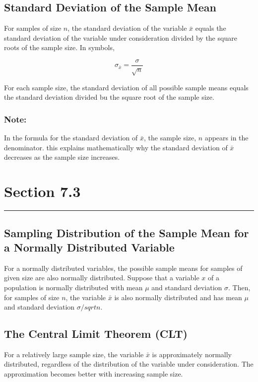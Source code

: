 \documentclass[12pt]{article}
\begin{document}
        \subsection*{Standard Deviation of the Sample Mean}
            For samples of size $n$, the standard deviation of the variable $\bar{x}$ equals the 
            standard deviation of the variable under consideration divided by the square roots
            of the sample size. In symbols,
            \begin{center}
                \[
                    \sigma_{\bar{x}} = \frac{\sigma}{\sqrt{n}}
                \]
            \end{center}
            For each sample size, the standard deviation of all possible sample means equals the
            standard deviation divided bu the square root of the sample size.
            \subsubsection*{Note:}
                In the formula for the standard deviation of $\bar{x}$, the sample size, $n$
                appears in the denominator. this explains mathematically why the standard
                deviation of $\bar{x}$ decreases as the sample size increases.
    \section*{Section 7.3}
    \noindent\rule{\textwidth}{0.4pt}
        \subsection*{Sampling Distribution of the Sample Mean for a Normally Distributed
        Variable}
            For a normally distributed variables, the possible sample means for samples of given
            size are also normally distributed. Suppose that a variable $x$ of a population is
            normally distributed with mean $\mu$ and standard deviation $\sigma$. Then, for
            samples of size $n$, the variable $\bar{x}$ is also normally distributed and has mean
            $\mu$ and standard deviation $\sigma / sqrt{n}$.
        \subsection*{The Central Limit Theorem (CLT)}
            For a relatively large sample size, the variable $\bar{x}$ is approximately normally
            distributed, regardless of the distribution of the variable under consideration. The
            approximation becomes better with increasing sample size.
\end{document}
